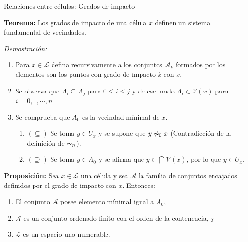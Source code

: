 \documentclass[9pt]{beamer}
\begin{document}
\begin{frame}{Relaciones entre células: Grados de impacto}

\textbf{Teorema:} Los grados de impacto de una célula $x$ definen un sistema fundamental de vecindades.

\underline{\textit{Demostración:}}
\begin{enumerate}
    \item Para $x\in\mathcal{L}$ defina recursivamente a los conjuntos $\mathcal{A}_k$ formados por los elementos son los puntos con grado de impacto $k$ con $x$.
    \item Se observa que $A_i\subseteq A_j$ para $0\leq i\leq j$ y de ese modo $A_i\in\mathcal{V}(x)$ para $i=0,1,\cdots,n$
    \item Se comprueba que $A_0$ es la vecindad mínimal de $x$. 
    \begin{enumerate}
        \item $(\subseteq)$ Se toma $y\in U_x$ y se supone que $y\not\thicksim_0 x$ (Contradicción de la definición de $\thicksim_n$).
        \item $(\supseteq)$ Se toma $y\in A_0$ y se afirma que $y\in\bigcap\mathcal{V}(x)$, por lo que $y\in U_x$.
    \end{enumerate}
\end{enumerate}

\textbf{Proposición:} Sea $x\in\mathcal{L}$ una célula y sea $\mathcal{A}$ la familia de conjuntos encajados definidos por el grado de impacto con $x$. Entonces:
\begin{enumerate}
    \item El conjunto $\mathcal{A}$ posee elemento mínimal igual a $A_0$,
    \item $\mathcal{A}$ es un conjunto ordenado finito con el orden de la contenencia, y
    \item $\mathcal{L}$ es un espacio uno-numerable.
\end{enumerate}

\end{frame}
\end{document}
